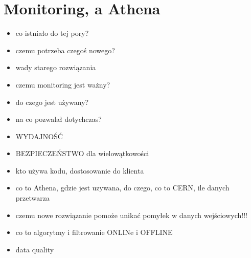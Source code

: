 \section{Monitoring, a Athena}
\begin{itemize}
\item co istniało do tej pory?
\item czemu potrzeba czegoś nowego?
\item wady starego rozwiązania
\item czemu monitoring jest ważny?
\item do czego jest używany?
\item na co pozwalał dotychczas?
\item WYDAJNOŚĆ
\item BEZPIECZEŃSTWO dla wielowątkowości
\item kto używa kodu, dostosowanie do klienta
\item co to Athena, gdzie jest uzywana, do czego, co to CERN, ile danych przetwarza
\item czemu nowe rozwiązanie pomoże unikać pomyłek w danych wejściowych!!!
\item co to algorytmy i filtrowanie ONLINe i OFFLINE
\item data quality
\end{itemize}